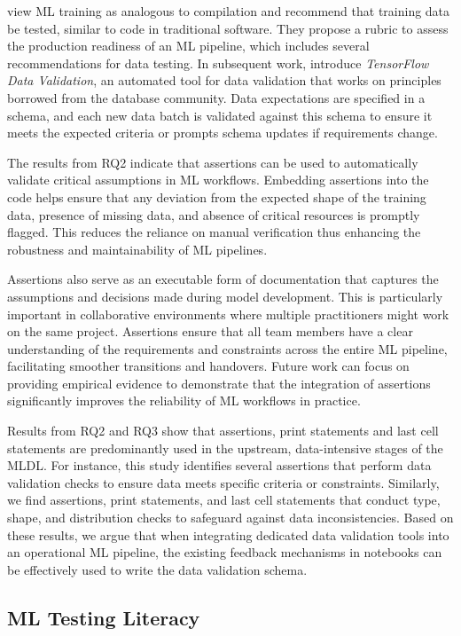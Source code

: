 \documentclass[smallextended]{svjour3}       %
\begin{document}
\citet{breck2017ml} view ML training as analogous to compilation and recommend that training data be tested, similar to code in traditional software. They propose a rubric to assess the production readiness of an ML pipeline, which includes several recommendations for data testing. In subsequent work, \citet{breck2019data} introduce \emph{TensorFlow Data Validation}, an automated tool for data validation that works on principles borrowed from the database community. Data expectations are specified in a schema, and each new data batch is validated against this schema to ensure it meets the expected criteria or prompts schema updates if requirements change.

The results from RQ2 indicate that assertions can be used to automatically validate critical assumptions in ML workflows. Embedding assertions into the code helps ensure that any deviation from the expected shape of the training data, presence of missing data, and absence of critical resources is promptly flagged. This reduces the reliance on manual verification thus enhancing the robustness and maintainability of ML pipelines.

Assertions also serve as an executable form of documentation that captures the assumptions and decisions made during model development. This is particularly important in collaborative environments where multiple practitioners might work on the same project. Assertions ensure that all team members have a clear understanding of the requirements and constraints across the entire ML pipeline, facilitating smoother transitions and handovers. Future work can focus on providing empirical evidence to demonstrate that the integration of assertions significantly improves the reliability of ML workflows in practice.

Results from RQ2 and RQ3 show that assertions, print statements and last cell statements are predominantly used in the upstream, data-intensive stages of the MLDL. For instance, this study identifies several assertions that perform data validation checks to ensure data meets specific criteria or constraints. Similarly, we find assertions, print statements, and last cell statements that conduct type, shape, and distribution checks to safeguard against data inconsistencies. Based on these results, we argue that when integrating dedicated data validation tools into an operational ML pipeline, the existing feedback mechanisms in notebooks can be effectively used to write the data validation schema.

\subsection{ML Testing Literacy}
\end{document}
